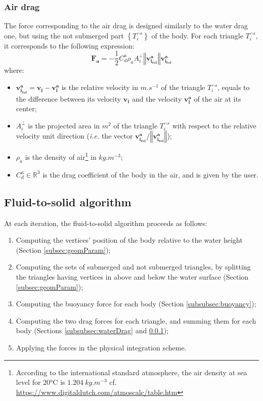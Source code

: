 \documentclass[final]{jcgt}
\def\ie{\emph{i.e.}\xspace}
\begin{document}
\subsubsection{Air drag}
\label{subsubsec:airDrag}
The force corresponding to the air drag is designed similarly to the water drag one, but using the not submerged part $\left\lbrace T_i^{\neg s}\right\rbrace$ of the body.
For each triangle $T_i^{\neg s}$, it corresponds to the following expression:
\begin{equation}
	\mathbf{F_a}= -\frac{1}{2} C_d^a\rho_a A_i^{\perp}\left\Vert\mathbf{v_{i_{rel}}^a}\right\Vert \mathbf{v_{i_{rel}}^a}
\end{equation}
where:
\begin{itemize}
	\item $\mathbf{v_{i_{rel}}^a}=\mathbf{v_i}-\mathbf{v_{i}^a}$ is the relative velocity in $m.s^{-1}$ of the triangle $T_i^{\neg s}$, equals to the difference between its velocity $\mathbf{v_i}$ and the velocity $\mathbf{v_{i}^a}$ of the air at its center;
	\item $A_i^{\perp}$ is the projected area in $m^2$ of the triangle $T_i^{\neg s}$ with respect to the relative velocity unit direction (\ie the vector $\mathbf{v_{i_{rel}}^a}/\left\Vert\mathbf{v_{i_{rel}}^a}\right\Vert$);
	\item $\rho_a$ is the density of air\footnote{According to the international standard atmosphere, the air density at sea level for $20$°C is $1.204~kg.m^{-3}$ cf. \url{https://www.digitaldutch.com/atmoscalc/table.htm}} in $kg.m^{-3}$;
	\item $C_d^a\in\mathbb{R}^3$ is the drag coefficient of the body in the air, and is given by the user.
\end{itemize}

\subsection{Fluid-to-solid algorithm}
\label{subsec:algoForces}
At each iteration, the fluid-to-solid algorithm proceeds as follows:
\begin{enumerate}
	\item Computing the vertices' position of the body relative to the water height (Section \ref{subsec:geomParam});
	\item Computing the sets of submerged and not submerged triangles, by splitting the triangles having vertices in above and below the water surface (Section \ref{subsec:geomParam});
	\item Computing the buoyancy force for each body (Section \ref{subsubsec:buoyancy});
	\item Computing the two drag forces for each triangle, and summing them for each body (Sections \ref{subsubsec:waterDrag} and \ref{subsubsec:airDrag});
	\item Applying the forces in the physical integration scheme.
\end{enumerate}
\end{document}
